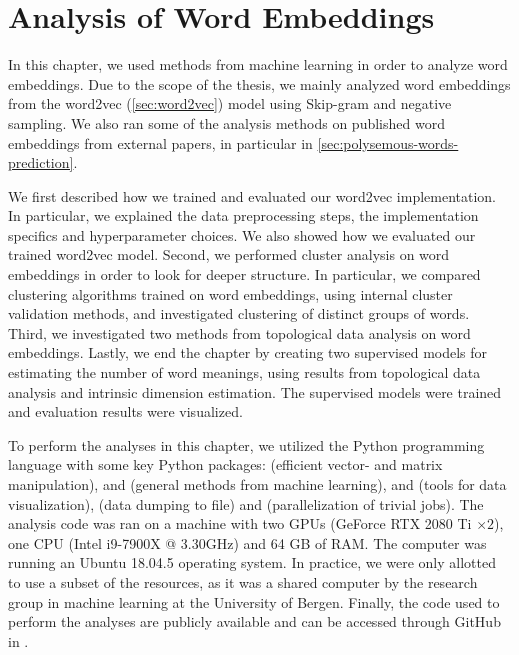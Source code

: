 \chapter{Analysis of Word Embeddings}
\label{chap:analysis-of-word-embeddings}
In this chapter, we used methods from machine learning in order to analyze word embeddings. Due to the scope of the thesis, we mainly analyzed word embeddings from the word2vec (\cref{sec:word2vec}) model using Skip-gram and negative sampling. We also ran some of the analysis methods on published word embeddings from external papers, in particular in \cref{sec:polysemous-words-prediction}.

We first described how we trained and evaluated our word2vec implementation. In particular, we explained the data preprocessing steps, the implementation specifics and hyperparameter choices. We also showed how we evaluated our trained word2vec model. Second, we performed cluster analysis on word embeddings in order to look for deeper structure. In particular, we compared clustering algorithms trained on word embeddings, using internal cluster validation methods, and investigated clustering of distinct groups of words. Third, we investigated two methods from topological data analysis on word embeddings. Lastly, we end the chapter by creating two supervised models for estimating the number of word meanings, using results from topological data analysis and intrinsic dimension estimation. The supervised models were trained and evaluation results were visualized.

To perform the analyses in this chapter, we utilized the Python programming language with some key Python packages:  \cite{2020NumPy-Array} (efficient vector- and matrix manipulation),  \cite{ScikitLearn2011} and  \cite{2020SciPy-NMeth} (general methods from machine learning),  \cite{Matplotlib2007} and  \cite{seaborn2021} (tools for data visualization),  \cite{joblib2021} (data dumping to file) and   \cite{sharedmem2020} (parallelization of trivial jobs). The analysis code was ran on a machine with two GPUs (GeForce RTX 2080 Ti $\times2$), one CPU (Intel i9-7900X @ 3.30GHz) and 64 GB of RAM. The computer was running an Ubuntu 18.04.5 operating system. In practice, we were only allotted to use a subset of the resources, as it was a shared computer by the research group in machine learning at the University of Bergen. Finally, the code used to perform the analyses are publicly available and can be accessed through GitHub in \cite{Triki2021}.



